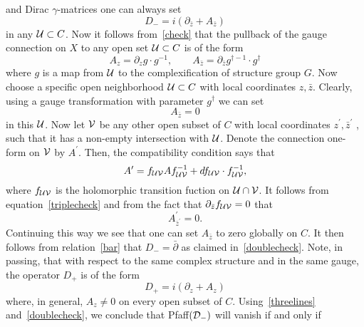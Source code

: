 \documentclass[a4paper,12pt]{article}
\numberwithin{equation}{section}
\theoremstyle{plain}
\begin{document}
and
Dirac $\gamma$-matrices one can always set
%
\begin{equation}
D_{-} = i(\partial_{\bar z} + A_{\bar z})
\label{bar}
\end{equation}
%
in any ${\cal{U}} \subset  C$. Now it follows from~\eqref{check} that
the pullback of the gauge connection on $X$ to any open set
${\cal{U}} \subset C$ is of the form
%
\begin{equation}
A_{z} = \partial_{z} g \cdot g^{-1},
\qquad A_{\bar z} = \partial_{\bar z} g^{\dagger -1}\cdot
g^{\dagger}
\label{21}
\end{equation}
%
where $g$ is a map from ${\cal{U}}$ to the complexification of structure
group $G$.
Now choose
a specific open neighborhood ${\cal{U}} \subset C$ with local coordinates
$z, \bar z$. Clearly, using a gauge transformation with parameter
$g^{\dagger}$ we can set
%
\begin{equation}
A_{\bar z} =0
\label{triplecheck}
\end{equation}
%
in this ${\cal{U}}$. Now let ${\cal{V}}$ be any other open subset of $C$
with local
coordinates $z^{\prime}, \bar z^{\prime}$ , such that it has a non-empty
intersection with ${\cal{U}}$. Denote the connection one-form on
${\cal{V}}$ by
$A^{\prime}$.
Then, the compatibility condition says that
%
\begin{equation}
A^{\prime} = f_{{\cal{U}}{\cal{V}}}Af^{-1}_{{\cal{U}}{\cal{V}}} +
df_{{\cal{U}}{\cal{V}}} \cdot f^{-1}_{{\cal{U}}{\cal{V}}},
\label{22}
\end{equation}
%
where $f_{{\cal{U}}{\cal{V}}}$ is the holomorphic transition fuction on
${\cal{U}} \cap {\cal{V}}$.
It follows from equation~\eqref{triplecheck} and from the fact that
$\partial_{\bar z}f_{{\cal{U}}{\cal{V}}}=0$ that
%
\begin{equation}
A^{\prime}_{\bar z^{\prime}}=0.
\label{23}
\end{equation}
%
Continuing this way we see that one can set $A_{\bar z}$ to zero globally
on $C$. It then follows from relation~\eqref{bar} that
$D_{-} = \bar \partial$ as claimed in~\eqref{doublecheck}. Note, in
passing,
that with respect to the same complex structure and in the same gauge,
the operator $D_{+}$ is of the form
%
\begin{equation}
D_{+} = i(\partial_{z} + A_{z})
\label{24}
\end{equation}
%
where, in general, $A_{z} \neq 0$ on every open subset of $C$.
Using~\eqref{threelines} and~\eqref{doublecheck}, we conclude that
Pfaff$({\cal D}_{-})$ will vanish if and only if
\end{document}
